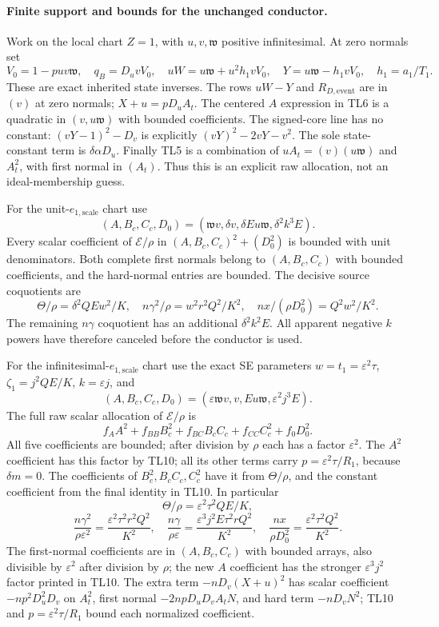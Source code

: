 \paragraph{Finite support and bounds for the unchanged conductor.}
Work on the local chart $Z=1$, with $u,v,\mathfrak w$ positive
infinitesimal. At zero normals set
\[
 V_0=1-puv\mathfrak w,\quad q_B=D_uvV_0,\quad
 uW=u\mathfrak w+u^2h_1vV_0,\quad
 Y=u\mathfrak w-h_1vV_0,\quad h_1=a_1/T_1.
\tag{TL7}
\]
These are exact inherited state inverses. The rows $uW-Y$ and
$R_{D,\mathrm{event}}$ are in $(v)$ at zero normals;
$X+u=pD_uA_t$. The centered $A$ expression in TL6 is a quadratic
in $(v,u\mathfrak w)$ with bounded coefficients. The signed-core
line has no constant: $(vY-1)^2-D_v$ is explicitly
$(vY)^2-2vY-v^2$. The sole state-constant term is
$\delta\alpha D_u$. Finally TL5 is a combination of
$uA_t=(v)(u\mathfrak w)$ and $A_t^2$, with first normal in $(A_t)$.
Thus this is an explicit raw allocation, not an ideal-membership guess.

For the unit-$e_{1,\mathrm{scale}}$ chart use
\[
 (A,B_c,C_c,D_0)
 =(\mathfrak wv,\delta v,\delta E u\mathfrak w,\delta^2k^3E).
\]
Every scalar coefficient of $\mathscr E/\rho$ in
$(A,B_c,C_c)^2+(D_0^2)$ is bounded with unit denominators. Both complete
first normals belong to $(A,B_c,C_c)$ with bounded coefficients, and
the hard-normal entries are bounded. The decisive source coquotients
are
\[
 \Theta/\rho=\delta^2QEw^2/K,\quad
 n\gamma^2/\rho=w^2r^2Q^2/K^2,\quad
 nx/(\rho D_0^2)=Q^2w^2/K^2.
\tag{TL8}
\]
The remaining $n\gamma$ coquotient has an additional $\delta^2k^2E$.
All apparent negative $k$ powers have therefore canceled before the
conductor is used.

For the infinitesimal-$e_{1,\mathrm{scale}}$ chart use the exact SE
parameters $w=t_1=\varepsilon^2\tau$,
$\zeta_1=j^2QE/K$, $k=\varepsilon j$, and
\[
 (A,B_c,C_c,D_0)
 =(\varepsilon\mathfrak wv,v,Eu\mathfrak w,\varepsilon^2j^3E).
\]
The full raw scalar allocation of $\mathscr E/\rho$ is
\[
 f_AA^2+f_{BB}B_c^2+f_{BC}B_cC_c+f_{CC}C_c^2+f_0D_0^2.
\tag{TL9}
\]
All five coefficients are bounded; after division by $\rho$ each has a
factor $\varepsilon^2$. The $A^2$ coefficient has this factor by TL10;
all its other terms carry $p=\varepsilon^2\tau/R_1$, because
$\delta m=0$. The coefficients of $B_c^2,B_cC_c,C_c^2$ have it
from $\Theta/\rho$, and the constant coefficient from the final
identity in TL10. In particular
\[
 \Theta/\rho=\varepsilon^2\tau^2QE/K,
\]
\[
 \frac{n\gamma^2}{\rho\varepsilon^2}
 =\frac{\varepsilon^2\tau^2r^2Q^2}{K^2},\quad
 \frac{n\gamma}{\rho\varepsilon}
 =\frac{\varepsilon^3j^2E\tau^2rQ^2}{K^2},\quad
 \frac{nx}{\rho D_0^2}
 =\frac{\varepsilon^2\tau^2Q^2}{K^2}.
\tag{TL10}
\]
The first-normal coefficients are in $(A,B_c,C_c)$ with bounded
arrays, also divisible by $\varepsilon^2$ after division by $\rho$;
the new $A$ coefficient has the stronger $\varepsilon^3j^2$ factor
printed in TL10. The extra term $-nD_v(X+u)^2$ has scalar coefficient
$-np^2D_u^2D_v$ on $A_t^2$, first normal
$-2npD_uD_vA_tN$, and hard term $-nD_vN^2$; TL10 and
$p=\varepsilon^2\tau/R_1$ bound each normalized coefficient.

